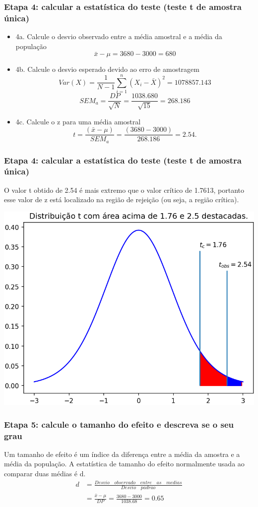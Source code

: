 \documentclass[11pt]{beamer}
\begin{document}
\begin{frame}
\frametitle{Etapa 4: calcular a estatística do teste (teste t de amostra única)}
\begin{itemize}
\item 4a. Calcule o desvio observado entre a média amostral e a média da população
\[\bar{x} - \mu = 3680-3000 = 680\]
\item 4b. Calcule o desvio esperado devido ao erro de amostragem
\[Var(X) = \frac{1}{N-1}\sum_{i=1}^n(X_i - \bar{X})^2 = 1078857.143\]
\[SEM_a = \frac{DP}{\sqrt{N}} = \frac{1038.680}{\sqrt{15}} = 268.186\]
\item 4c. Calcule o z para uma média amostral
\[t = \frac{(\bar{x} - \mu)}{SEM_a} = \frac{(3680-3000)}{268.186} = 2.54.\]
\end{itemize}
\end{frame}

\begin{frame}
\frametitle{Etapa 4: calcular a estatística do teste (teste t de amostra única)}
O valor t obtido de 2.54 é mais extremo que o valor crítico de 1.7613, portanto esse valor de z está localizado na região de rejeição (ou seja, a região crítica).
\begin{center}\includegraphics[width=0.55\linewidth]{figs/regiao_critica_observada_t} \end{center}

\end{frame}


\begin{frame}
\frametitle{Etapa 5: calcule o tamanho do efeito e descreva se o seu grau}
Um tamanho de efeito é um índice da diferença entre a média da amostra e a média da população. A estatística de tamanho do efeito normalmente usada ao comparar duas médias é d. 
\begin{align*}
d &= \frac{Desvio\quad observado\quad entre\quad as\quad medias}{Desvio\quad padrao}\\
  &= \frac{\bar{x}-\mu}{DP} = \frac{3680 - 3000}{1038.68} = 0.65
\end{align*}

\end{frame}
\end{document}
